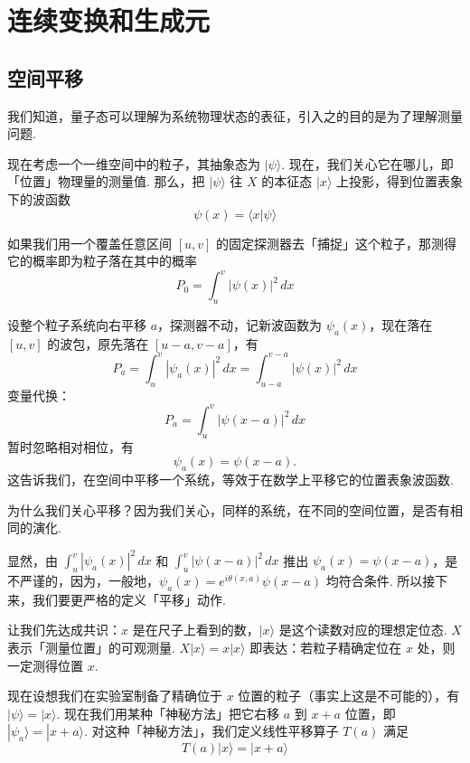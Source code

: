 \chapter{连续变换和生成元}

\section{空间平移}

\label{pondering:meaning}

我们知道，量子态可以理解为系统物理状态的表征，引入之的目的是为了理解测量问题.

现在考虑一个一维空间中的粒子，其抽象态为 \(|\psi\rangle\). 现在，我们关心它在哪儿，即「位置」物理量的测量值. 那么，把 \(|\psi\rangle\) 往 \(X\) 的本征态 \(|x\rangle\) 上投影，得到位置表象下的波函数
\[
\psi(x)=\langle x|\psi\rangle
\]

如果我们用一个覆盖任意区间 \([u,v]\) 的固定探测器去「捕捉」这个粒子，那测得它的概率即为粒子落在其中的概率
\[
P_0=\int_u^v |\psi(x)|^2\,dx
\]

设整个粒子系统向右平移 \(a\)，探测器不动，记新波函数为 \(\psi_a(x)\)，现在落在 \([u,v]\) 的波包，原先落在 \([u-a,v-a]\)，有
\[
P_a=\int_u^v |\psi_a(x)|^2\,dx=\int_{u-a}^{v-a}|\psi(x)|^2\,dx
\]
变量代换：
\[
P_a=\int_u^v |\psi(x-a)|^2\,dx
\]
暂时忽略相对相位，有
\[
\psi_a(x)=\psi(x-a).
\]
这告诉我们，在空间中平移一个系统，等效于在数学上平移它的位置表象波函数.

为什么我们关心平移？因为我们关心，同样的系统，在不同的空间位置，是否有相同的演化.

\label{pondering:operator}

显然，由 \(\int_u^v|\psi_a(x)|^2\,dx\) 和 \(\int_u^v|\psi(x-a)|^2\,dx\) 推出 \(\psi_a(x)=\psi(x-a)\)，是不严谨的，因为，一般地，\(\psi_a(x)=e^{i\theta(x,a)}\psi(x-a)\) 均符合条件. 所以接下来，我们要更严格的定义「平移」动作.

让我们先达成共识：\(x\) 是在尺子上看到的数，\(|x\rangle\) 是这个读数对应的理想定位态. \(X\) 表示「测量位置」的可观测量. \(X|x\rangle=x|x\rangle\) 即表达：若粒子精确定位在 \(x\) 处，则一定测得位置 \(x\).

现在设想我们在实验室制备了精确位于 \(x\) 位置的粒子（事实上这是不可能的），有 \(|\psi\rangle=|x\rangle\). 现在我们用某种「神秘方法」把它右移 \(a\) 到 \(x+a\) 位置，即 \(|\psi_a\rangle=|x+a\rangle\). 对这种「神秘方法」，我们定义线性平移算子 \(T(a)\) 满足
\[
T(a)|x\rangle=|x+a\rangle
\]

